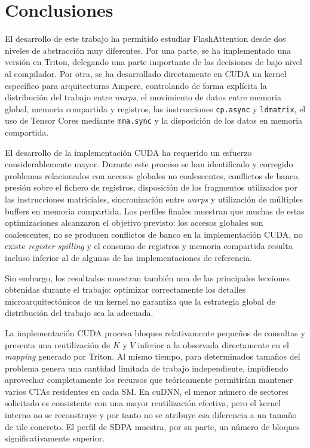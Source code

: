 \chapter{Conclusiones}

El desarrollo de este trabajo ha permitido estudiar FlashAttention desde dos niveles de abstracción muy diferentes. Por una parte, se ha implementado una versión en Triton, delegando una parte importante de las decisiones de bajo nivel al compilador. Por otra, se ha desarrollado directamente en CUDA un kernel específico para arquitecturas Ampere, controlando de forma explícita la distribución del trabajo entre \textit{warps}, el movimiento de datos entre memoria global, memoria compartida y registros, las instrucciones \texttt{cp.async} y \texttt{ldmatrix}, el uso de Tensor Cores mediante \texttt{mma.sync} y la disposición de los datos en memoria compartida.

El desarrollo de la implementación CUDA ha requerido un esfuerzo considerablemente mayor. Durante este proceso se han identificado y corregido problemas relacionados con accesos globales no coalescentes, conflictos de banco, presión sobre el fichero de registros, disposición de los fragmentos utilizados por las instrucciones matriciales, sincronización entre \textit{warps} y utilización de múltiples buffers en memoria compartida. Los perfiles finales muestran que muchas de estas optimizaciones alcanzaron el objetivo previsto: los accesos globales son coalescentes, no se producen conflictos de banco en la implementación CUDA, no existe \textit{register spilling} y el consumo de registros y memoria compartida resulta incluso inferior al de algunas de las implementaciones de referencia.

Sin embargo, los resultados muestran también una de las principales lecciones obtenidas durante el trabajo: optimizar correctamente los detalles microarquitectónicos de un kernel no garantiza que la estrategia global de distribución del trabajo sea la adecuada.

La implementación CUDA procesa bloques relativamente pequeños de consultas y presenta una reutilización de \(K\) y \(V\) inferior a la observada directamente en el \textit{mapping} generado por Triton. Al mismo tiempo, para determinados tamaños del problema genera una cantidad limitada de trabajo independiente, impidiendo aprovechar completamente los recursos que teóricamente permitirían mantener varios CTAs residentes en cada SM. En cuDNN, el menor número de sectores solicitado es consistente con una mayor reutilización efectiva, pero el kernel interno no se reconstruye y por tanto no se atribuye esa diferencia a un tamaño de tile concreto. El perfil de SDPA muestra, por su parte, un número de bloques significativamente superior.

